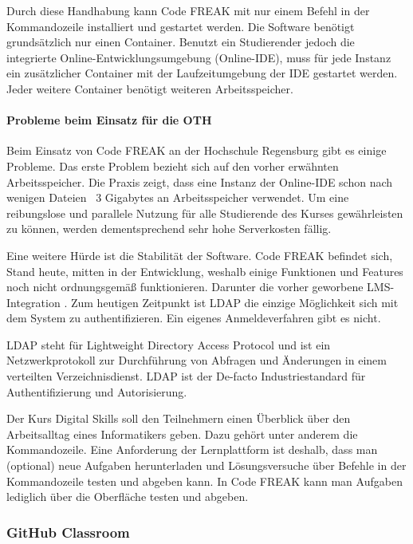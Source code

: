 Durch diese Handhabung kann Code FREAK mit nur einem Befehl in der
Kommandozeile installiert und gestartet werden. Die Software benötigt
grundsätzlich nur einen Container. Benutzt ein Studierender jedoch die
integrierte Online-Entwicklungsumgebung (Online-IDE), muss für jede Instanz ein
zusätzlicher Container mit der Laufzeitumgebung der IDE gestartet werden. Jeder
weitere Container benötigt weiteren Arbeitsspeicher.

\paragraph{Probleme beim Einsatz für die OTH}
Beim Einsatz von Code FREAK an der Hochschule Regensburg gibt es einige
Probleme. Das erste Problem bezieht sich auf den vorher erwähnten
Arbeitsspeicher. Die Praxis zeigt, dass eine Instanz der Online-IDE schon nach
wenigen Dateien ~3 Gigabytes an Arbeitsspeicher verwendet. Um eine reibungslose
und parallele Nutzung für alle Studierende des Kurses gewährleisten zu können,
werden dementsprechend sehr hohe Serverkosten fällig. 
\parencite{codefreak-memory-problem}

Eine weitere Hürde ist die Stabilität der Software. Code FREAK befindet sich,
Stand heute, mitten in der Entwicklung, weshalb einige Funktionen und Features
noch nicht ordnungsgemäß funktionieren. Darunter die vorher geworbene
LMS-Integration \parencite{codefreak-docs}. Zum heutigen Zeitpunkt ist LDAP die
einzige Möglichkeit sich mit dem System zu authentifizieren. Ein eigenes
Anmeldeverfahren gibt es nicht.

LDAP steht für \glqq Lightweight Directory Access Protocol\grqq{} und ist ein
Netzwerkprotokoll zur Durchführung von Abfragen und Änderungen in einem 
verteilten Verzeichnisdienst. LDAP ist der De-facto Industriestandard für
Authentifizierung und Autorisierung. \parencite{ldap}

Der Kurs Digital Skills soll den Teilnehmern einen Überblick über den
Arbeitsalltag eines Informatikers geben. Dazu gehört unter anderem die
Kommandozeile. Eine Anforderung der Lernplattform ist deshalb, dass man
(optional) neue Aufgaben herunterladen und Lösungsversuche über Befehle in der
Kommandozeile testen und abgeben kann. In Code FREAK kann man Aufgaben lediglich
über die Oberfläche testen und abgeben.

\newpage
\subsubsection{GitHub Classroom}
